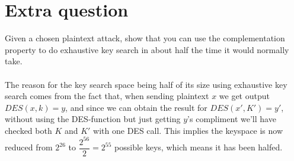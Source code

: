 \documentclass[paper=a4, fontsize=11pt]{scrartcl} %
\numberwithin{equation}{section} %
\numberwithin{figure}{section} %
\numberwithin{table}{section} %
\begin{document}
	\section{Extra question}
	Given a chosen plaintext attack, show that you can use the complementation property to do exhaustive key search in about half the time it would normally take. \\ \\
	The reason for the key search space being half of its size using exhaustive key search comes from the fact that, when sending plaintext $x$ we get output $DES(x,k)=y$, and since we can obtain the result for $DES(x',K')=y'$, without using the DES-function but just getting $y$'s compliment we'll have checked both $K$ and $K'$ with one DES call. This implies the keyspace is now reduced from $2^{26}$ to $\dfrac{2^{56}}{2}=2^{55}$ possible keys, which means it has been halfed.  
	
\end{document}
